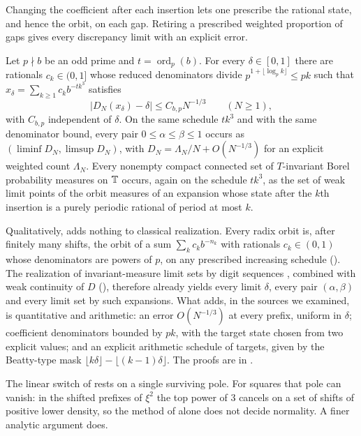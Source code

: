 \documentclass[11pt]{article}
\DeclareMathOperator{\ord}{ord}
\begin{document}
Changing the coefficient after each insertion lets one prescribe the rational state, and hence the
orbit, on each gap. Retiring a prescribed weighted proportion of gaps gives every discrepancy limit
with an explicit error.

\begin{maintheorem}\label{thm:C}
Let $p\nmid b$ be an odd prime and $t=\ord_p(b)$. For every $\delta\in[0,1]$ there are rationals
$c_k\in(0,1]$ whose reduced denominators divide $p^{1+\lfloor\log_pk\rfloor}\le pk$ such that
$x_\delta=\sum_{k\ge1}c_kb^{-tk^3}$ satisfies
\[
|D_N(x_\delta)-\delta|\le C_{b,p}N^{-1/3}\qquad(N\ge1),
\]
with $C_{b,p}$ independent of $\delta$. On the same schedule $tk^3$ and with the same denominator bound,
every pair $0\le\alpha\le\beta\le1$ occurs as $(\liminf D_N,\limsup D_N)$, with
$D_N=\Lambda_N/N+O(N^{-1/3})$ for an explicit weighted count $\Lambda_N$. Every nonempty compact
connected set of $T$-invariant Borel probability measures on $\mathbb T$ occurs, again on the schedule $tk^3$,
as the set of weak limit points of the orbit measures of an expansion whose state after the $k$th
insertion is a purely periodic rational of period at most $k$.
\end{maintheorem}

Qualitatively,  adds nothing to classical realization. Every radix orbit is, after
finitely many shifts, the orbit of a sum $\sum_kc_kb^{-n_k}$ with rationals $c_k\in(0,1)$ whose
denominators are powers of $p$, on any prescribed increasing schedule (). The
realization of invariant-measure limit sets by digit sequences \cite{Colebrook,Sigmund74,DGS}, combined
with weak continuity of $D$ (), therefore already yields every limit $\delta$, every pair
$(\alpha,\beta)$ and every limit set by such expansions. What  adds, in the sources we
examined, is quantitative and arithmetic: an error $O(N^{-1/3})$ at every prefix, uniform in $\delta$;
coefficient denominators bounded by $pk$, with the target state chosen from two explicit values; and an
explicit arithmetic schedule of targets, given by the Beatty-type mask
$\lfloor k\delta\rfloor-\lfloor(k-1)\delta\rfloor$. The proofs are in .

The linear switch of  rests on a single surviving pole. For squares that pole can
vanish: in the shifted prefixes of $\xi^2$ the top power of $3$ cancels on a set of shifts of positive
lower density, so the method of  alone does not decide normality. A finer analytic argument
does.
\end{document}
